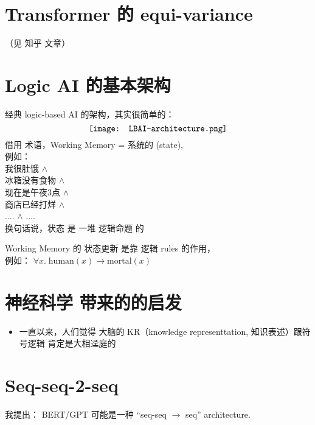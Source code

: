 \section{Transformer 的 equi-variance}

（见 知乎 文章）

\section{Logic AI 的基本架构}

经典 logic-based AI 的架构，其实很简单的：
\begin{equation}
\vcenter{\hbox{\texttt{[image: LBAI-architecture.png]}}}
\end{equation}
借用  术语，Working Memory = 系统的  (state), \\
例如： \\
\tab 我很肚饿 $\wedge$ \\
\tab 冰箱没有食物 $\wedge$ \\
\tab 现在是午夜3点 $\wedge$ \\
\tab 商店已经打烊 $\wedge$ \\
\tab .... $\wedge$ .... \\
换句话说，状态 是 一堆 逻辑命题 的 

Working Memory 的 状态更新 是靠 逻辑 rules 的作用，\\
例如： $\forall x. \; \mbox{human}(x) \rightarrow \mbox{mortal}(x)$

\section{神经科学 带来的的启发}

\begin{itemize}
	\item 一直以来，人们觉得 大脑的 KR（knowledge representtation, 知识表述）跟符号逻辑 肯定是大相迳庭的
\end{itemize}

\section{Seq-seq-2-seq}

我提出： BERT/GPT 可能是一种 ``seq-seq $\rightarrow$ seq'' architecture.

